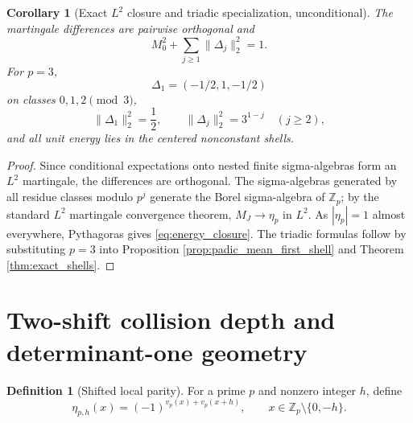 \documentclass[11pt]{amsart}
\numberwithin{equation}{section}
\theoremstyle{plain}
\newtheorem{corollary}[theorem]{Corollary}
\theoremstyle{definition}
\newtheorem{definition}[theorem]{Definition}
\theoremstyle{remark}
\newcommand{\Z}{\mathbb Z}
\begin{document}
\begin{corollary}[Exact $L^2$ closure and triadic specialization, unconditional]
\label{cor:padic_closure}
The martingale differences are pairwise orthogonal and
\begin{equation}
M_0^2+\sum_{j\ge1}\|\Delta_j\|_2^2=1.
\label{eq:energy_closure}
\end{equation}
For $p=3$,
\begin{equation}
\Delta_1=(-1/2,1,-1/2)
\label{eq:triadic_first_shell}
\end{equation}
on classes $0,1,2\pmod3$,
\begin{equation}
\|\Delta_1\|_2^2=\frac12,
\qquad
\|\Delta_j\|_2^2=3^{1-j}\quad(j\ge2),
\label{eq:triadic_shell_energies}
\end{equation}
and all unit energy lies in the centered nonconstant shells.
\end{corollary}

\begin{proof}
Since conditional expectations onto nested finite sigma-algebras form an $L^2$ martingale, the differences are orthogonal.  The sigma-algebras generated by all residue classes modulo $p^j$ generate the Borel sigma-algebra of $\Z_p$; by the standard $L^2$ martingale convergence theorem, $M_J\to\eta_p$ in $L^2$.  As $|\eta_p|=1$ almost everywhere, Pythagoras gives \eqref{eq:energy_closure}.  The triadic formulas follow by substituting $p=3$ into Proposition \ref{prop:padic_mean_first_shell} and Theorem \ref{thm:exact_shells}.
\end{proof}

\section{Two-shift collision depth and determinant-one geometry}
\label{sec:two_shift}

\begin{definition}[Shifted local parity]
\label{def:eta_ph}
For a prime $p$ and nonzero integer $h$, define
\begin{equation}
\eta_{p,h}(x)=(-1)^{v_p(x)+v_p(x+h)},
\qquad x\in\Z_p\setminus\{0,-h\}.
\label{eq:eta_ph}
\end{equation}
\end{definition}
\end{document}
